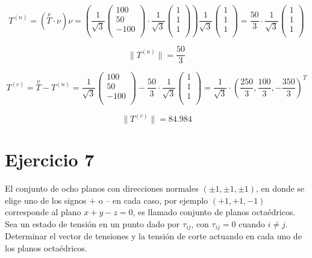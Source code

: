 \documentclass[a4paper,12pt,twoside,final,spanish]{article}
\begin{document}
\[
T^{(n)}=(\stackrel \nu T\cdot\nu)\nu=\left(
\frac{1}{\sqrt{3}}
\left(\begin{matrix}
100 \\
50 \\
-100 \\
\end{matrix}\right)\cdot
\frac{1}{\sqrt{3}}
\left(\begin{matrix}
1 \\
1 \\
1 \\
\end{matrix}\right)\right)
\frac{1}{\sqrt{3}}
\left(\begin{matrix}
1 \\
1 \\
1 \\
\end{matrix}\right)=
\frac{50}{3}\cdot
\frac{1}{\sqrt{3}}
\left(\begin{matrix}
1 \\
1 \\
1 \\
\end{matrix}\right)
\]

\[
\|T^{(n)}\|=\frac{50}{3}
\]

\[
T^{(c)}=\stackrel \nu T-T^{(n)}=
\frac{1}{\sqrt{3}}
\left(\begin{matrix}
100 \\
50 \\
-100 \\
\end{matrix}\right)-
\frac{50}{3}\cdot
\frac{1}{\sqrt{3}}
\left(\begin{matrix}
1 \\
1 \\
1 \\
\end{matrix}\right)=\frac{1}{\sqrt{3}}\cdot
\left(\frac{250}{3},\frac{100}{3},-\frac{350}{3}\right)^{T}
\]

\[
\|T^{(c)}\|=84.984
\]

\section*{Ejercicio 7}

El conjunto de ocho planos con direcciones normales $(\pm 1,\pm 1,\pm 1)$, en donde se elige uno de los signos $+$ o – en cada caso, por ejemplo $(+1,+1,-1)$ corresponde  al plano $x+y-z=0$, es llamado conjunto de planos octaédricos. Sea un estado de tensión en un punto dado por $\tau_{ij}$, con $\tau_{ij}=0$ cuando $i\neq j$. Determinar el vector de tensiones y la tensión de corte actuando en cada uno de los planos octaédricos. 
\end{document}
